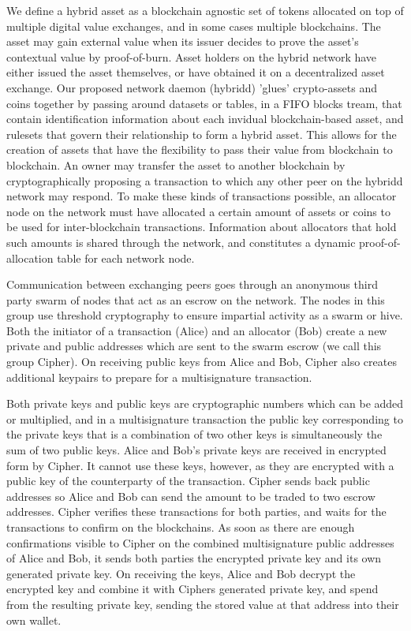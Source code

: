 \documentclass[a4paper]{article}
\begin{document}
We define a hybrid asset as a blockchain agnostic set of tokens\cite{coloredcoins} allocated on top of multiple digital value exchanges, and in some cases multiple blockchains. The asset may gain external value when its issuer decides to prove the asset's contextual value by proof-of-burn\cite{proofofburn}. Asset holders on the hybrid network have either issued the asset themselves, or have obtained it on a decentralized asset exchange. Our proposed network daemon (hybridd) 'glues' crypto-assets and coins together by passing around datasets or tables, in a FIFO blocks tream, that contain identification information about each invidual blockchain-based asset, and rulesets that govern their relationship to form a hybrid asset. This allows for the creation of assets that have the flexibility to pass their value from blockchain to blockchain. An owner may transfer the asset to another blockchain by cryptographically proposing a transaction to which any other peer on the hybridd network may respond. To make these kinds of transactions possible, an allocator node on the network must have allocated a certain amount of assets or coins to be used for inter-blockchain transactions. Information about allocators that hold such amounts is shared through the network, and constitutes a dynamic proof-of-allocation table for each network node.

Communication between exchanging peers goes through an anonymous third party swarm of nodes that act as an escrow on the network. The nodes in this group use threshold cryptography to ensure impartial activity as a swarm or hive. Both the initiator of a transaction (Alice) and an allocator (Bob) create a new private and public addresses which are sent to the swarm escrow (we call this group Cipher). On receiving public keys from Alice and Bob, Cipher also creates additional keypairs to prepare for a multisignature transaction\cite{multisig}.

Both private keys and public keys are cryptographic numbers which can be added or multiplied, and in a multisignature transaction the public key corresponding to the private keys that is a combination of two other keys is simultaneously the sum of two public keys. Alice and Bob's private keys are received in encrypted form by Cipher. It cannot use these keys, however, as they are encrypted with a public key of the counterparty of the transaction. Cipher sends back public addresses so Alice and Bob can send the amount to be traded to two escrow addresses. Cipher verifies these transactions for both parties, and waits for the transactions to confirm on the blockchains. As soon as there are enough confirmations visible to Cipher on the combined multisignature public addresses of Alice and Bob, it sends both parties the encrypted private key and its own generated private key. On receiving the keys, Alice and Bob decrypt the encrypted key and combine it with Ciphers generated private key, and spend from the resulting private key, sending the stored value at that address into their own wallet.
\end{document}

